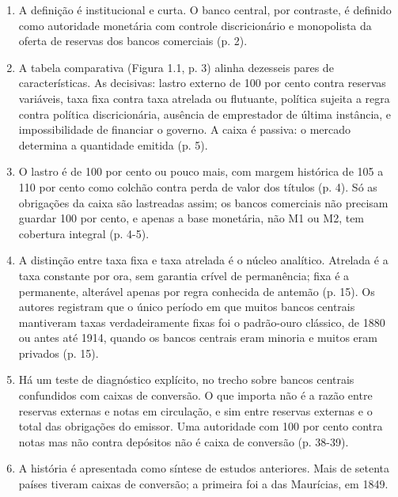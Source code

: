 \begin{enumerate}[leftmargin=*,nosep]
\item A definição é institucional e curta.
O banco central, por contraste, é definido como autoridade monetária com
controle discricionário e monopolista da oferta de reservas dos bancos
comerciais (p. 2).
\item A tabela comparativa (Figura 1.1, p. 3) alinha dezesseis pares de
características. As decisivas: lastro externo de 100 por cento contra reservas
variáveis, taxa fixa contra taxa atrelada ou flutuante, política sujeita a
regra contra política discricionária, ausência de emprestador de última
instância, e impossibilidade de financiar o governo. A caixa é passiva: o
mercado determina a quantidade emitida (p. 5).
\item O lastro é de 100 por cento ou pouco mais, com margem histórica de 105 a
110 por cento como colchão contra perda de valor dos títulos (p. 4). Só as
obrigações da caixa são lastreadas assim; os bancos comerciais não precisam
guardar 100 por cento, e apenas a base monetária, não M1 ou M2, tem cobertura
integral (p. 4-5).
\item A distinção entre taxa fixa e taxa atrelada é o núcleo analítico. Atrelada
é a taxa constante por ora, sem garantia crível de permanência; fixa é a
permanente, alterável apenas por regra conhecida de antemão (p. 15). Os autores
registram que o único período em que muitos bancos centrais mantiveram taxas
verdadeiramente fixas foi o padrão-ouro clássico, de 1880 ou antes até 1914,
quando os bancos centrais eram minoria e muitos eram privados (p. 15).
\item Há um teste de diagnóstico explícito, no trecho sobre bancos centrais
confundidos com caixas de conversão. O que importa não é a razão entre reservas
externas e notas em circulação, e sim entre reservas externas e o total das
obrigações do emissor. Uma autoridade com 100 por cento contra notas mas não
contra depósitos não é caixa de conversão (p. 38-39).
\item A história é apresentada como síntese de estudos anteriores. Mais de
setenta países tiveram caixas de conversão; a primeira foi a das Maurícias, em
1849.
\end{enumerate}
